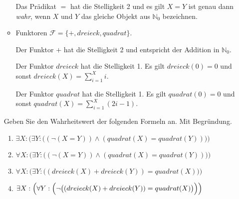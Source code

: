 \documentclass{uebungsblatt}
\begin{document}
\begin{aufgabe}
\begin{enumerate}
\begin{itemize}
Das Prädikat $=$ hat die Stelligkeit 2 und es gilt
$X = Y$ ist genau dann \textit{wahr}, wenn $X$ und $Y$ das gleiche Objekt aus $\mathbb{N}_0$ bezeichnen.

\item
Funktoren $\mathcal{F} = \{ +, dreieck, quadrat \}$.

Der Funktor $+$ hat die Stelligkeit 2 und entspricht der Addition in $\mathbb{N}_0$.

Der Funktor $dreieck$ hat die Stelligkeit 1. Es gilt 
$dreieck(0) = 0$ und sonst $dreieck(X) = \sum_{i=1}^{X} i$. 

Der Funktor $quadrat$ hat die Stelligkeit 1. Es gilt $quadrat(0) = 0$ 
und sonst $quadrat(X) = \sum_{i=1}^{X} (2i-1)$.
\end{itemize}

Geben Sie den Wahrheitswert der folgenden Formeln an. Mit Begründung.
\begin{enumerate}
\item 
$\exists X : \bigl( \exists Y : \bigl( (\neg (X = Y)) \wedge (quadrat(X) = quadrat(Y)) \bigr) \bigr)$\\

\item 
$\forall X : \bigl( \exists Y : \bigl( (\neg (X = Y)) \wedge (quadrat(X) = quadrat(Y)) \bigr) \bigr)$\\

\item 
$\forall X : \bigl( \exists Y : 
\bigl(
(dreieck(X) + dreieck(Y)) = quadrat(X) 
\bigr)
\bigr)$\\

\item 
$\exists X: 
\Bigl( \forall Y : 
\Bigl(  \neg
\bigl(
(dreieck(X) + dreieck(Y)) = quadrat(X) 
\bigr)
\Bigr)
\Bigr)$


\end{enumerate}

\end{enumerate}



\end{aufgabe}
\begin{loesung}

\end{loesung}
\end{document}
